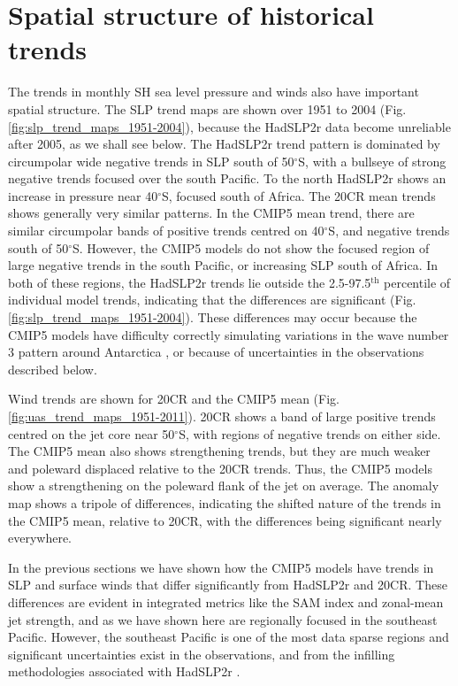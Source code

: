 \documentclass{ametsoc}
\begin{document}
\section{Spatial structure of historical trends} \label{sec:spatial_patterns}
The trends in monthly SH sea level pressure and winds also have important spatial structure. The SLP
trend maps are shown over 1951 to 2004 (Fig. \ref{fig:slp_trend_maps_1951-2004}), 
because the HadSLP2r data become unreliable after 2005, as we shall see below. The HadSLP2r trend
pattern is dominated by circumpolar wide negative trends in SLP south of 50$^{\circ}$S, with 
a bullseye of strong negative trends focused over the south Pacific. To the north
HadSLP2r shows an increase in pressure near 40$^{\circ}$S, focused south of Africa. The 20CR mean trends 
shows generally very similar patterns. In the CMIP5 mean trend, there are similar circumpolar bands 
of positive trends centred
on 40$^{\circ}$S, and negative trends south of 50$^{\circ}$S. However, the CMIP5 models do not show the
focused region of large negative trends in the south Pacific, or increasing SLP south of Africa. 
In both  of these regions, the HadSLP2r trends lie outside the 2.5-97.5$^\textrm{th}$ percentile of
individual model trends, indicating  that the differences are significant 
(Fig. \ref{fig:slp_trend_maps_1951-2004}). These differences may occur because the CMIP5 models
have difficulty correctly simulating variations in the wave number 3 pattern around Antarctica 
\citep{Marshall_Bracegirdle_2014}, or because of uncertainties in the observations described below.

Wind trends are shown for 20CR and the CMIP5 mean (Fig. \ref{fig:uas_trend_maps_1951-2011}).  
20CR shows a band of large positive trends centred on the jet core near 50$^{\circ}$S, with
regions of negative trends on either side. The CMIP5 mean also shows strengthening trends,
but they are much weaker and poleward displaced relative to the 20CR trends. Thus,
the CMIP5 models show a strengthening on the poleward flank of the jet on average.  The anomaly map
shows a tripole of differences, indicating the shifted nature of the trends in the CMIP5 mean,
relative to 20CR, with the differences being significant nearly everywhere. 

In the previous sections we have shown how the CMIP5 models have trends in SLP and surface winds
that differ significantly from HadSLP2r and 20CR. These differences are evident in integrated metrics 
like the SAM index and zonal-mean jet strength, and as we have shown here are regionally focused in
the southeast Pacific. However, the southeast Pacific is one of the most data sparse regions
and significant uncertainties exist in the observations, and from the infilling methodologies 
associated with HadSLP2r \citep{Allan_and_Ansell_2006}. 
\end{document}
